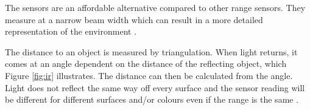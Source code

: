 The sensors are an affordable alternative compared to other range sensors. They measure at a narrow beam width which can result in a more detailed representation of the environment \cite{infrared}.

The distance to an object is measured by triangulation. When light returns, it comes at an angle dependent on the distance of the reflecting object, which Figure \ref{fig:ir} illustrates. The distance can then be calculated from the angle. Light does not reflect the same way off every surface and the sensor reading will be different for different surfaces and/or colours even if the range is the same \cite{infrared}.

\newpage